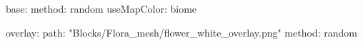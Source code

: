 base:
  method: random
  useMapColor: biome
  
overlay:
  path: "Blocks/Flora_mesh/flower_white_overlay.png"
  method: random